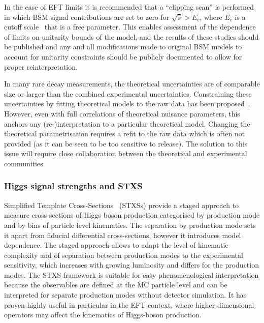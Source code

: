 \documentclass[a4paper,aps,prd,longbibliography,notitlepage,showpacs,amsmath,amssymb,superscriptaddress,nofootinbib,floatfix,11pt,preprintnumbers]{revtex4-1-mod}
\begin{document}
In the case of EFT limits it is recommended that a ``clipping scan'' is performed in which BSM signal contributions are set to zero for $\sqrt{\hat{s}}>E_c$, where $E_c$ is a cutoff scale~\cite{Baak:2013fwa} that is a free parameter. This enables assessment of the dependence of limits on unitarity bounds of the model, and the results of these studies should be published and any and all modifications made to original BSM models to account for unitarity constraints should be publicly documented to allow for proper reinterpretation.

In many rare decay measurements, the theoretical uncertainties are of comparable size or larger than the combined experimental uncertainties. Constraining these uncertainties by fitting theoretical models to the raw data has been proposed~\cite{Hurth:2017sqw,Blake:2017fyh,Chrzaszcz:2018yza}. However, even with full correlations of theoretical nuisance parameters, this anchors any (re-)interpretation to a particular theoretical model. Changing the theoretical parametrisation requires a refit to the raw data which is often not provided (as it can be seen to be too sensitive to release). The solution to this issue will require close collaboration between the theoretical and experimental communities.
\\

\subsubsection{Higgs signal strengths and STXS} \label{sec:higgsdata}

Simplified Template Cross-Sections~\cite{deFlorian:2016spz} (STXSs) provide a staged approach to measure cross-sections of  Higgs boson production categorised by production mode and by bins of particle level kinematics.  The separation by production mode sets it apart from fiducial differential cross-sections, however it introduces model dependence. The staged approach allows to adapt the level of kinematic complexity and of separation between production modes to the experimental sensitivity, which increases with growing luminosity and differs for  the production modes. The STXS framework is suitable for easy phenomenological interpretation because the observables are defined at the MC particle level and can be interpreted for separate production modes without detector simulation. It has proven highly useful in particular in the EFT  context, where higher-dimensional operators may affect the kinematics of Higgs-boson production.
\end{document}
